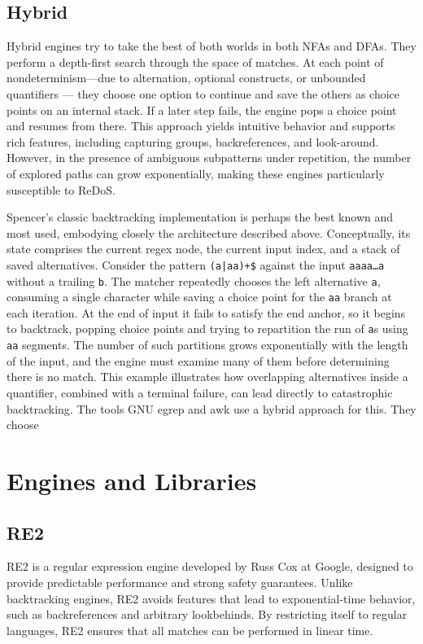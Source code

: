 \subsection{Hybrid}
Hybrid engines try to take the best of both worlds in both NFAs and DFAs. They perform a depth-first search through the space of matches. At each point of nondeterminism—due to alternation, optional constructs, or unbounded quantifiers — they choose one option to continue and save the others as choice points on an internal stack. If a later step fails, the engine pops a choice point and resumes from there. This approach yields intuitive behavior and supports rich features, including capturing groups, backreferences, and look-around. However, in the presence of ambiguous subpatterns under repetition, the number of explored paths can grow exponentially, making these engines particularly susceptible to ReDoS.

Spencer’s classic backtracking implementation is perhaps the best known and most used, embodying closely the architecture described above. Conceptually, its state comprises the current regex node, the current input index, and a stack of saved alternatives. Consider the pattern \texttt{(a|aa)+\$} against the input \texttt{aaaa\ldots a} without a trailing \texttt{b}. The matcher repeatedly chooses the left alternative \texttt{a}, consuming a single character while saving a choice point for the \texttt{aa} branch at each iteration. At the end of input it fails to satisfy the end anchor, so it begins to backtrack, popping choice points and trying to repartition the run of \texttt{a}s using \texttt{aa} segments. The number of such partitions grows exponentially with the length of the input, and the engine must examine many of them before determining there is no match. This example illustrates how overlapping alternatives inside a quantifier, combined with a terminal failure, can lead directly to catastrophic backtracking.
The tools GNU egrep and awk use a hybrid approach for this. They choose

\section{Engines and Libraries}
\subsection{RE2}
RE2 is a regular expression engine developed by Russ Cox at Google, designed to provide predictable performance and strong safety guarantees. Unlike backtracking engines, RE2 avoids features that lead to exponential-time behavior, such as backreferences and arbitrary lookbehinds. By restricting itself to regular languages, RE2 ensures that all matches can be performed in linear time. \cite{russ_cox_regexp3}

